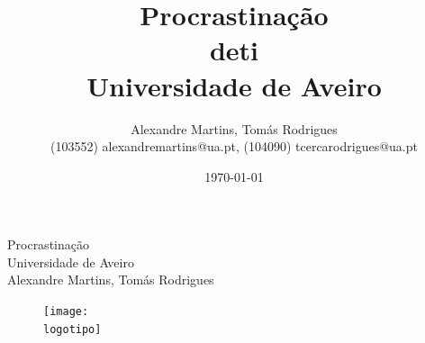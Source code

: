 \documentclass{report}
\begin{document}
%
\def\titulo{Procrastinação}
\def\data{\today}

\def\autores{Alexandre Martins, Tomás Rodrigues }
\def\autorescontactos{(103552) alexandremartins@ua.pt, (104090) tcercarodrigues@ua.pt}
\def\departamento{\ac{deti}}
\def\empresa{Universidade de Aveiro}
\def\logotipo{ua.pdf}
%
%
\renewcommand{\contentsname}{Índice}
\begin{titlepage}

\begin{center}
%
\vspace*{50mm}
%
{\Huge \titulo}\\ 
%
\vspace{10mm}
%
{\Large \empresa}\\
%
\vspace{10mm}
%
{\LARGE \autores}\\ 
%
\vspace{30mm}
%
\begin{figure}[h]
\center
\texttt{[image: \\logotipo]}
\end{figure}
%
\vspace{30mm}
\end{center}
%
\begin{flushright}

\end{flushright}
\end{titlepage}

\title{%
{\Huge\textbf{\titulo}}\\
{\Large \departamento\\ \empresa}
}
%
\author{%
    \autores \\
    \autorescontactos
}
%
\date{\data}
%
\maketitle

\end{document}
